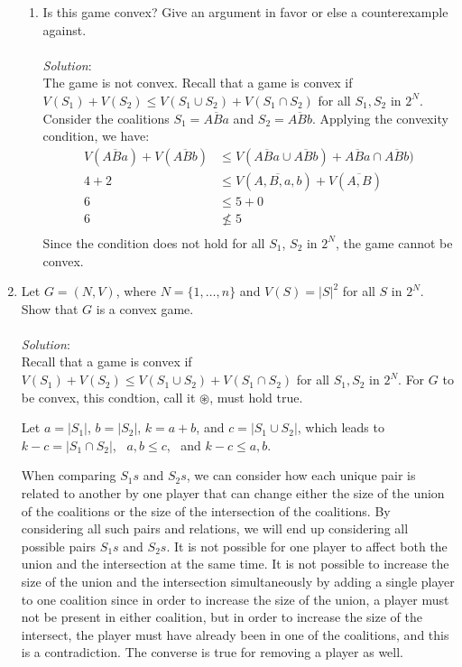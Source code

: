 \documentclass{article}
\begin{document}
\begin{enumerate}
\begin{enumerate}
    \item Is this game convex? Give an argument in favor or else a counterexample against. \\\\
    \textit{Solution}:\\
    The game is not convex. Recall that a game is convex if $V(S_{1}) + V(S_{2}) \le V(S_{1} \cup S_{2}) + V(S_{1} \cap S_{2})$ for all $S_{1}, S_{2}$ in $2^{N}$.
    Consider the coalitions $S_{1} = \overline{ABa}$ and $S_{2} = \overline{ABb}$. Applying the convexity condition, we have:
    \begin{align*}
    V(\overline{ABa}) + V(\overline{ABb})  &\le      V(\overline{ABa} \cup \overline{ABb})      + \overline{ABa} \cap \overline{ABb}) \\
    4                 + 2                  &\le      V(\overline{A, B, a, b})                   + V(\overline{A, B}) \\
    6                                      &\le      5                                          + 0 \\
    6                                      &\not\le  5 \\
    \end{align*}
    Since the condition does not hold for all $S_{1}$, $S_{2}$ in $2^{N}$, the game cannot be convex.

    \end{enumerate}

%
\hfill\newline
\item Let $G = (N, V)$, where $N = \{1, \dots, n\}$ and $V(S) = |S|^{2}$ for all $S$ in $2^{N}$. Show that $G$ is a convex game. \\\\
\textit{Solution}:\\
Recall that a game is convex if $V(S_{1}) + V(S_{2}) \le V(S_{1} \cup S_{2}) + V(S_{1} \cap S_{2})$ for all $S_{1}, S_{2}$ in $2^{N}$. For $G$ to be convex, this condtion, call it $\circledast$, must hold true.

Let $a = |S_{1}|$, $b = |S_{2}|$, $k = a + b$, and $c = |S_{1} \cup S_{2}|$, which leads to $k - c =  |S_{1} \cap S_{2}|$, \, $a, b \le c$, \, and $k - c \le a, b$.

When comparing $S_{1}s$ and $S_{2}s$, we can consider how each unique pair is related to another by one player that can change either the size of the union of the coalitions or the size of the intersection of the coalitions. By considering all such pairs and relations, we will end up considering all possible pairs $S_{1}s$ and $S_{2}s$. It is not possible for one player to affect both the union and the intersection at the same time. It is not possible to increase the size of the union and the intersection simultaneously by adding a single player to one coalition since in order to increase the size of the union, a player must not be present in either coalition, but in order to increase the size of the intersect, the player must have already been in one of the coalitions, and this is a contradiction. The converse is true for removing a player as well.


\end{enumerate}
\end{document}
